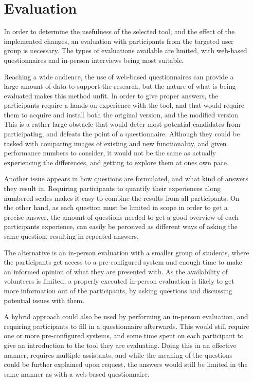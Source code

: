 \section{Evaluation}\label{methEval}

In order to determine the usefulness of the selected tool, and the effect of the implemented changes, an evaluation with participants from the targeted user group is necessary.
The types of evaluations available are limited, with web-based questionnaires and in-person interviews being most suitable.

Reaching a wide audience, the use of web-based questionnaires can provide a large amount of data to support the research, but the nature of what is being evaluated makes this method unfit.
In order to give proper answers, the participants require a hands-on experience with the tool, and that would require them to acquire and install both the original version, and the modified version
This is a rather large obstacle that would deter most potential candidates from participating, and defeats the point of a questionnaire.
Although they could be tasked with comparing images of existing and new functionality, and given performance numbers to consider, it would not be the same as actually experiencing the differences, and getting to explore them at ones own pace.

Another issue appears in how questions are formulated, and what kind of answers they result in.
Requiring participants to quantify their experiences along numbered scales makes it easy to combine the results from all participants.
On the other hand, as each question must be limited in scope in order to get a precise answer, the amount of questions needed to get a good overview of each participants experience, can easily be perceived as different ways of asking the same question, resulting in repeated answers.

The alternative is an in-person evaluation with a smaller group of students, where the participants get access to a pre-configured system and enough time to make an informed opinion of what they are presented with.
As the availability of volunteers is limited, a properly executed in-person evaluation is likely to get more information out of the participants, by asking questions and discussing potential issues with them.

A hybrid approach could also be used by performing an in-person evaluation, and requiring participants to fill in a questionnaire afterwards.
This would still require one or more pre-configured systems, and some time spent on each participant to give an introduction to the tool they are evaluating.
Doing this in an effective manner, requires multiple assistants, and while the meaning of the questions could be further explained upon request, the answers would still be limited in the same manner as with a web-based questionnaire.


